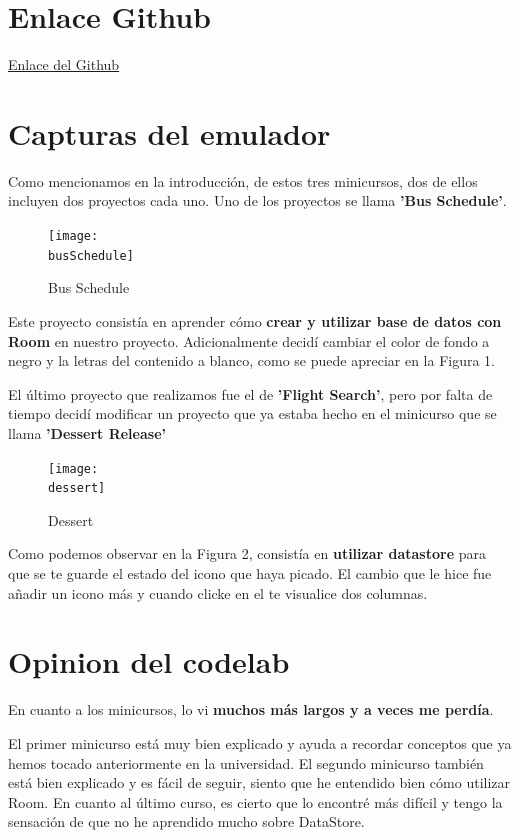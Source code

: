 \documentclass[a4paper]{article}
\newcommand{\busSchedule}{imagenes/busSchedule.png}
\newcommand{\dessert}{imagenes/dessert.png}
\begin{document}
    \section{Enlace Github}
    \href{https://github.com/AnaSantana016/PAMN_G13/tree/Practica6}{Enlace del Github} 
    
    \section{Capturas del emulador}

    Como mencionamos en la introducción, de estos tres minicursos, dos de ellos incluyen dos proyectos cada uno. Uno de los proyectos se llama \textbf{'Bus Schedule'}.

    \begin{figure}[h]
        \texttt{[image: \\busSchedule]}
        \caption{Bus Schedule}
    \end{figure}

    Este proyecto consistía en aprender cómo \textbf{crear y utilizar base de datos con Room} en nuestro proyecto. Adicionalmente decidí cambiar el color de fondo a negro y la letras del contenido a blanco, como se puede apreciar en la Figura 1.

    \newpage
    
    El último proyecto que realizamos fue el de \textbf{'Flight Search'}, pero por falta de tiempo decidí modificar un proyecto que ya estaba hecho en el minicurso que se llama \textbf{'Dessert Release'}

    \begin{figure}[h]
        \texttt{[image: \\dessert]}
        \caption{Dessert}
    \end{figure}

    Como podemos observar en la Figura 2, consistía en \textbf{utilizar datastore} para que se te guarde el estado del icono que haya picado. El cambio que le hice fue añadir un icono más y cuando clicke en el te visualice dos columnas.
    
    \section{Opinion del codelab}

    En cuanto a los minicursos, lo vi \textbf{muchos más largos y a veces me perdía}.\vspace{0.3cm}
    
    El primer minicurso está muy bien explicado y ayuda a recordar conceptos que ya hemos tocado anteriormente en la universidad. El segundo minicurso también está bien explicado y es fácil de seguir, siento que he entendido bien cómo utilizar Room. En cuanto al último curso, es cierto que lo encontré más difícil y tengo la sensación de que no he aprendido mucho sobre DataStore.
    
\end{document}
